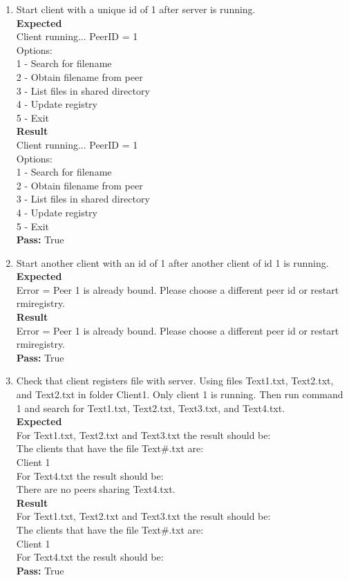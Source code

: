 \documentclass{article}
\begin{document}
\begin{enumerate}
\item Start client with a unique id of 1 after server is running.\\
\textbf{Expected}\\
Client running... PeerID = 1\\
Options:\\
1 - Search for filename\\
2 - Obtain filename from peer\\
3 - List files in shared directory\\
4 - Update registry\\
5 - Exit\\
\textbf{Result}\\
Client running... PeerID = 1\\
Options:\\
1 - Search for filename\\
2 - Obtain filename from peer\\
3 - List files in shared directory\\
4 - Update registry\\
5 - Exit\\
\textbf{Pass:} True\\


\item Start another client with an id of 1 after another client of id 1 is running.\\
\textbf{Expected}\\
Error = Peer 1 is already bound. Please choose a different peer id or restart rmiregistry.\\
\textbf{Result}\\
Error = Peer 1 is already bound. Please choose a different peer id or restart rmiregistry.\\
\textbf{Pass:} True\\

\item Check that client registers file with server. Using files Text1.txt, Text2.txt, and Text2.txt in folder Client1. Only client 1 is running. Then run command 1 and search for Text1.txt, Text2.txt, Text3.txt, and Text4.txt. \\
\textbf{Expected}\\
For Text1.txt, Text2.txt and Text3.txt the result should be:\\
The clients that have the file Text\#.txt are:\\
Client 1\\
For Text4.txt the result should be:\\
There are no peers sharing Text4.txt.\\
\textbf{Result}\\
For Text1.txt, Text2.txt and Text3.txt the result should be:\\
The clients that have the file Text\#.txt are:\\
Client 1\\
For Text4.txt the result should be:\\
\textbf{Pass:} True\\


\end{enumerate}
\end{document}
